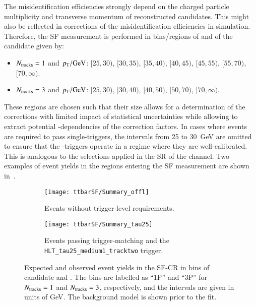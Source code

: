 The \jettotauhadvis misidentification efficiencies strongly depend on the
charged particle multiplicity and transverse momentum of reconstructed
\tauhadvis candidates. This might also be reflected in corrections of the
\jettotauhadvis misidentification efficiencies in simulation. Therefore, the SF
measurement is performed in bins/regions of \Ntracks and \pT of the \tauhadvis
candidate given by:
\begin{itemize}

\item $\Ntracks = 1$ and $\pT / \si{\GeV}$: $[25, 30)$, $[30, 35)$, $[35, 40)$,
  $[40, 45)$, $[45, 55)$, $[55, 70)$, $[70, \infty)$.

\item $\Ntracks = 3$ and $\pT / \si{\GeV}$: $[25, 30)$, $[30, 40)$, $[40, 50)$,
  $[50, 70)$, $[70, \infty)$.

\end{itemize}
These regions are chosen such that their size allows for a determination of the
corrections with limited impact of statistical uncertainties while allowing to
extract potential \pT-dependencies of the correction factors. In cases where
events are required to pass single-\tauhadvis triggers, the \pT intervals from
25 to \SI{30}{\GeV} are omitted to ensure that the \tauhadvis-triggers operate
in a regime where they are well-calibrated. This is analogous to the selections
applied in the SR of the \hadhad channel. Two examples of event yields in the
regions entering the SF measurement are shown
in~.

\begin{figure}[htbp]
  \centering

  \begin{subfigure}[t]{.48\textwidth}
    \texttt{[image: ttbarSF/Summary\_offl]}

    \caption{Events without trigger-level \tauid requirements.}
  \end{subfigure}\hfill%
  \begin{subfigure}[t]{.48\textwidth}
    \texttt{[image: ttbarSF/Summary\_tau25]}

    \caption{Events passing \tauhadvis trigger-matching and the
      \texttt{HLT\_tau25\_medium1\_tracktwo} trigger.}
  \end{subfigure}

  \caption{Expected and observed event yields in the SF-CR in bins of \tauhadvis
    candidate \Ntracks and \pT. The bins are labelled as ``1P'' and ``3P'' for
    $\Ntracks = 1$ and $\Ntracks = 3$, respectively, and the \pT intervals are
    given in units of \si{\GeV}. The background model is shown prior to the
    fit.}%
  \label{fig:ttbarsf_region_summary_prefit}
\end{figure}

